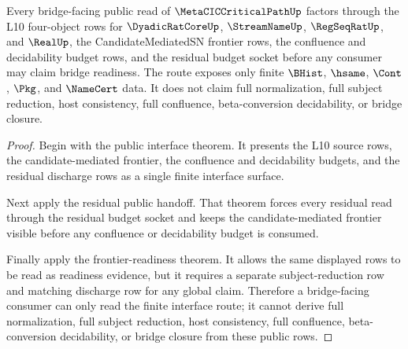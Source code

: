 \begin{theorem}
\label{thm:metacic-critical-path-bridge-route}
Every bridge-facing public read of $\MetaCICCriticalPathUp$ factors through the L10 four-object rows for $\DyadicRatCoreUp$, $\StreamNameUp$, $\RegSeqRatUp$, and $\RealUp$, the CandidateMediatedSN frontier rows, the confluence and decidability budget rows, and the residual budget socket before any consumer may claim bridge readiness. The route exposes only finite $\BHist$, $\hsame$, $\Cont$, $\Pkg$, and $\NameCert$ data. It does not claim full normalization, full subject reduction, host consistency, full confluence, beta-conversion decidability, or bridge closure.
\end{theorem}
\begin{proof}
Begin with the public interface theorem. It presents the L10 source rows, the candidate-mediated frontier, the confluence and decidability budgets, and the residual discharge rows as a single finite interface surface.

Next apply the residual public handoff. That theorem forces every residual read through the residual budget socket and keeps the candidate-mediated frontier visible before any confluence or decidability budget is consumed.

Finally apply the frontier-readiness theorem. It allows the same displayed rows to be read as readiness evidence, but it requires a separate subject-reduction row and matching discharge row for any global claim. Therefore a bridge-facing consumer can only read the finite interface route; it cannot derive full normalization, full subject reduction, host consistency, full confluence, beta-conversion decidability, or bridge closure from these public rows.
\end{proof}

